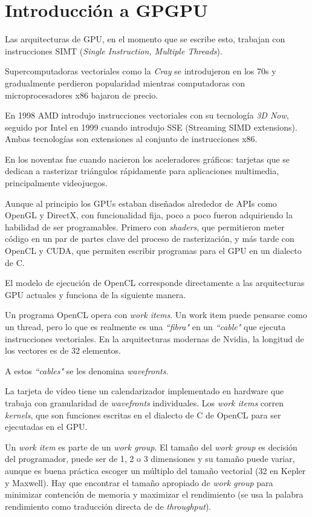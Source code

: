 \section{Introducción a GPGPU} \label{sec:gpgpu}

Las arquitecturas de GPU, en el momento que se escribe esto, trabajan con
instrucciones SIMT (\emph{Single Instruction, Multiple Threads}).

Supercomputadoras vectoriales como la \emph{Cray} se introdujeron en los 70s y
gradualmente perdieron popularidad mientras computadoras con microprocesadores
x86 bajaron de precio.

En 1998 AMD introdujo instrucciones vectoriales con su tecnología \emph{3D
Now}, seguido por Intel en 1999 cuando introdujo SSE (Streaming SIMD
extensions). Ambas tecnologías son extensiones al conjunto de instrucciones x86.

En los noventas fue cuando nacieron los aceleradores gráficos: tarjetas que se
dedican a rasterizar triángulos rápidamente para aplicaciones multimedia,
principalmente videojuegos.

Aunque al principio los GPUs estaban diseñados alrededor de APIs como OpenGL y
DirectX, con funcionalidad fija, poco a poco fueron adquiriendo la habilidad de
ser programables. Primero con \emph{shaders}, que permitieron meter código en
un par de partes clave del proceso de rasterización, y más tarde con OpenCL y
CUDA, que permiten escribir programas para el GPU en un dialecto de C.

El modelo de ejecución de OpenCL corresponde directamente a las arquitecturas GPU
actuales y funciona de la siguiente manera.

Un programa OpenCL opera con \emph{work items}. Un work item puede pensarse
como un thread, pero lo que es realmente es una \emph{``fibra"} en un
\emph{``cable"} que ejecuta instrucciones vectoriales. En la arquitecturas
modernas de Nvidia, la longitud de los vectores es de 32 elementos.

A estos \emph{``cables"} se les denomina \emph{wavefronts}.

La tarjeta de video tiene un calendarizador implementado en hardware que
trabaja con granularidad de \emph{wavefronts} individuales.  Los \emph{work
items} corren \emph{kernels}, que son funciones escritas en el
dialecto de C de OpenCL para ser ejecutadas en el GPU.

Un \emph{work item} es parte de un \emph{work group}. El tamaño del \emph{work
group} es decisión del programador, puede ser de 1, 2 o 3 dimensiones y su
tamaño puede variar, aunque es buena práctica escoger un múltiplo del tamaño
vectorial (32 en Kepler y Maxwell). Hay que encontrar el tamaño apropiado de
\emph{work group} para minimizar contención de memoria y maximizar el
rendimiento (se usa la palabra rendimiento como traducción directa de de
\emph{throughput}).

